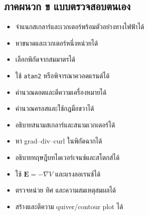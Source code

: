 \subsection{ภาคผนวก ข แบบตรวจสอบตนเอง}

\begin{itemize}
\item[$\square$]
  จำแนกสเกลาร์และเวกเตอร์พร้อมตัวอย่างทางไฟฟ้าได้
\item[$\square$]
  หาขนาดและเวกเตอร์หนึ่งหน่วยได้
\item[$\square$]
  เลือกพิกัดจากสมมาตรได้
\item[$\square$]
  ใช้ \texttt{atan2} หรือพิจารณาควอดแรนต์ได้
\item[$\square$]
  คำนวณดอตและตีความเครื่องหมายได้
\item[$\square$]
  คำนวณครอสและใช้กฎมือขวาได้
\item[$\square$]
  อธิบายสนามสเกลาร์และสนามเวกเตอร์ได้
\item[$\square$]
  หา grad--div--curl ในพิกัดฉากได้
\item[$\square$]
  อธิบายทฤษฎีบทไดเวอร์เจนซ์และสโตกส์ได้
\item[$\square$]
  ใช้ \(\mathbf{E}=-\nabla V\) และแรงลอเรนซ์ได้
\item[$\square$]
  ตรวจหน่วย ทิศ และความสมเหตุสมผลได้
\item[$\square$]
  สร้างและตีความ quiver/contour plot ได้
\end{itemize}
